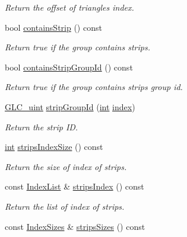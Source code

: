 \begin{DoxyCompactItemize}
\begin{DoxyCompactList}\small\item\em Return the offset of triangles index. \end{DoxyCompactList}\item 
bool \hyperlink{class_g_l_c___primitive_group_ac5b1736e04263599d53a7707612cc6db}{contains\-Strip} () const 
\begin{DoxyCompactList}\small\item\em Return true if the group contains strips. \end{DoxyCompactList}\item 
bool \hyperlink{class_g_l_c___primitive_group_a66cc59868cf7532a862172218c92975a}{contains\-Strip\-Group\-Id} () const 
\begin{DoxyCompactList}\small\item\em Return true if the group contains strips group id. \end{DoxyCompactList}\item 
\hyperlink{glc__global_8h_abf950976fabed69026558df8e2da6c6b}{G\-L\-C\-\_\-uint} \hyperlink{class_g_l_c___primitive_group_a53974be4ff7e3ec0d44c298abcffff82}{strip\-Group\-Id} (\hyperlink{ioapi_8h_a787fa3cf048117ba7123753c1e74fcd6}{int} \hyperlink{glext_8h_ab47dd9958bcadea08866b42bf358e95e}{index})
\begin{DoxyCompactList}\small\item\em Return the strip I\-D. \end{DoxyCompactList}\item 
\hyperlink{ioapi_8h_a787fa3cf048117ba7123753c1e74fcd6}{int} \hyperlink{class_g_l_c___primitive_group_ad78d59c0fa6f329f11174c575de40ee7}{strips\-Index\-Size} () const 
\begin{DoxyCompactList}\small\item\em Return the size of index of strips. \end{DoxyCompactList}\item 
const \hyperlink{glc__global_8h_a92568854751d0cfbc27eae9c76aab7cf}{Index\-List} \& \hyperlink{class_g_l_c___primitive_group_a32f2b3f37c98533d62ecf26a2e6e2921}{strips\-Index} () const 
\begin{DoxyCompactList}\small\item\em Return the list of index of strips. \end{DoxyCompactList}\item 
const \hyperlink{glc__global_8h_ad0cd3186041d4811de0ebb6ea411fd82}{Index\-Sizes} \& \hyperlink{class_g_l_c___primitive_group_ac6aba46c62ba8d08e816d0da3c13c507}{strips\-Sizes} () const 

\end{DoxyCompactItemize}
